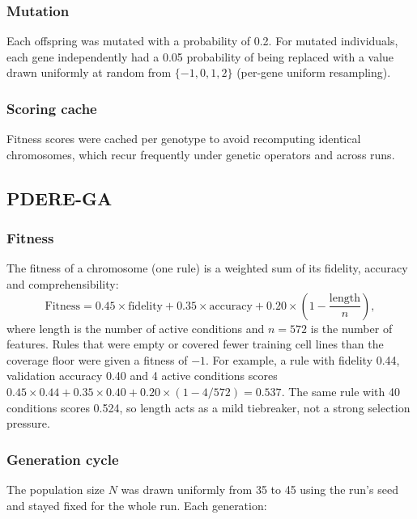 \subsubsection{Mutation}
\label{sec:mutation}

Each offspring was mutated with a probability of 0.2. For mutated individuals, each gene independently had a 0.05 probability of being replaced with a value drawn uniformly at random from $\{-1, 0, 1, 2\}$ (per-gene uniform resampling).

\subsubsection{Scoring cache}
\label{sec:cache}

Fitness scores were cached per genotype to avoid recomputing identical chromosomes, which recur frequently under genetic operators and across runs.

\subsection{PDERE-GA}
\label{sec:pdere-ga}

\subsubsection{Fitness}
\label{sec:fitness}

The fitness of a chromosome (one rule) is a weighted sum of its fidelity, accuracy and comprehensibility:
\[
  \text{Fitness} = 0.45 \times \text{fidelity} + 0.35 \times \text{accuracy} + 0.20 \times \left(1 - \frac{\text{length}}{n}\right),
\]
where length is the number of active conditions and $n = 572$ is the number of features. Rules that were empty or covered fewer training cell lines than the coverage floor were given a fitness of $-1$. For example, a rule with fidelity 0.44, validation accuracy 0.40 and 4 active conditions scores $0.45 \times 0.44 + 0.35 \times 0.40 + 0.20 \times (1 - 4/572) = 0.537$. The same rule with 40 conditions scores 0.524, so length acts as a mild tiebreaker, not a strong selection pressure.

\subsubsection{Generation cycle}
\label{sec:generation-ga}

The population size $N$ was drawn uniformly from 35 to 45 using the run's seed and stayed fixed for the whole run. Each generation:

